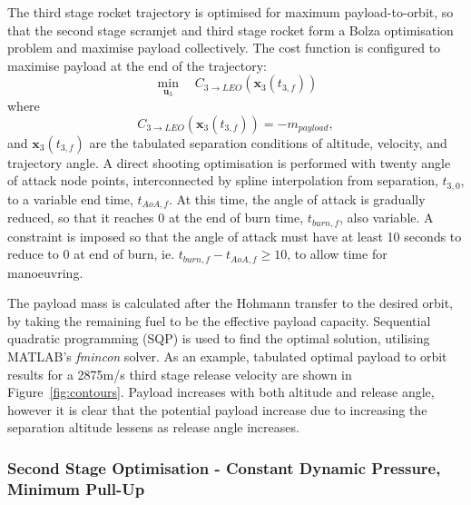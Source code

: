 \documentclass[journal]{new-aiaa}
\begin{document}
	  The third stage rocket trajectory is optimised for maximum payload-to-orbit, so that the second stage scramjet and third stage rocket form a Bolza optimisation problem and maximise payload collectively. The cost function is configured to maximise payload at the end of the trajectory:
	  \begin{equation} 
	  \min\limits_{\textbf{u}_3} \quad C_{3\rightarrow LEO}(\textbf{x}_{3}(t_{3,f})) 
	  \end{equation}
	  where
	  \begin{equation}
	  C_{3\rightarrow LEO}(\textbf{x}_{3}(t_{3,f})) = -m_{payload},
	  \end{equation}
	  and $\textbf{x}_{3}(t_{3,f})$ are the tabulated separation conditions of altitude, velocity, and trajectory angle. A direct shooting optimisation is performed with twenty angle of attack node points, interconnected by spline interpolation from separation, $t_{3,0}$, to a variable end time, $t_{AoA,f}$. At this time, the angle of attack is gradually reduced, so that it reaches 0 at the end of burn time, $t_{burn,f}$, also variable.  A constraint is imposed so that the angle of attack must have at least 10 seconds to reduce to 0 at end of burn, ie. $t_{burn,f} - t_{AoA,f} \ge 10$, to allow time for manoeuvring.
	 
	  
	  
	  The payload mass is calculated after the Hohmann transfer to the desired orbit, by taking the remaining fuel to be the effective payload capacity. Sequential quadratic programming (SQP) is used to find the optimal solution, utilising MATLAB's \textit{fmincon} solver.
	    As an example, tabulated optimal payload to orbit results for a 2875m/s third stage release velocity are shown in Figure~\ref{fig:contours}. Payload increases with both altitude and release angle, however it is clear that the potential payload increase due to increasing the separation altitude lessens as release angle increases.  
	    
	
	 
	 	 \subsubsection{Second Stage Optimisation - Constant Dynamic Pressure, Minimum Pull-Up}
	 	 
\end{document}
